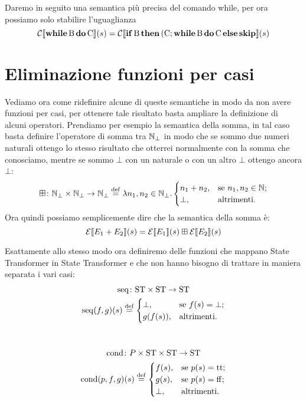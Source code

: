 Daremo in seguito una semantica più precisa del comando while, per ora possiamo solo stabilire l'uguaglianza
$$\mathcal{C} \llbracket \mathop{\textup{\textbf{while}}}\mathrm{B}\mathop{\textup{\textbf{do}}}\mathrm{C} \rrbracket (s) = \mathcal{C} \llbracket \mathop{\textup{\textbf{if}}}\mathrm{B}\mathop{\textup{\textbf{then}}}\mathrm{(C ; \mathop{\textup{\textbf{while}}}\mathrm{B}\mathop{\textup{\textbf{do}}}\mathrm{C}}\mathop{\textup{\textbf{else}}}\mathrm{\mathop{\textup{\textbf{skip}}}} \rrbracket (s)$$

\section{Eliminazione funzioni per casi} 
\label{sec:definizione di F}
Vediamo ora come ridefinire alcune di queste semantiche in modo da non avere funzioni per casi, per ottenere tale risultato basta ampliare la definizione di alcuni operatori. Prendiamo per esempio la semantica della somma, in tal caso basta definire l'operatore di somma tra $\mathbb{N}_\bot$ in modo che se sommo due numeri naturali ottengo lo stesso risultato che otterrei normalmente con la somma che conosciamo, mentre se sommo $\bot$ con un naturale o con un altro $\bot$ ottengo ancora $\bot$:
$$\fund{\conadd}{\Nset_\bot \times \Nset_\bot}{\Nset_\bot} \defeq \lambda n_1, n_2 \in \Nset_\bot . \begin{cases}
        n_1 + n_2, &\text{se $n_1, n_2 \in \Nset$;}\\
        \bot, &\text{altrimenti.}
        \end{cases}$$
Ora quindi possiamo semplicemente dire che la semantica della somma è:
$$\mathcal{E} \llbracket E_1 + E_2 \rrbracket (s) = \mathcal{E} \llbracket E_1 \rrbracket (s) \mathbin{\boxplus} \mathcal{E} \llbracket E_2 \rrbracket (s)$$

Esattamente allo stesso modo ora definiremo delle funzioni che mappano State Transformer in State Transformer e che non hanno bisogno di trattare in maniera separata i vari casi:
\begin{gather*}
\fund{\mathrm{seq}}{\ST \times \ST}{\ST} \\
\mathrm{seq}(f,g)(s) \defeq \begin{cases}
        \bot, &\text{se $f(s) = \bot$;}\\
        g(f(s)), &\text{altrimenti.}
        \end{cases}\\
\pts
\fund{\mathrm{cond}}{P \times \ST \times \ST}{\ST} \\
\mathrm{cond}(p,f,g)(s) \defeq \begin{cases}
        f(s), &\text{se $p(s) = \ttv$;}\\
        g(s), &\text{se $p(s) = \ffv$;}\\
        \bot, &\text{altrimenti.}
        \end{cases}\\
\end{gather*}

